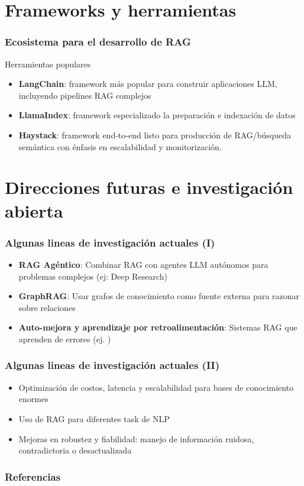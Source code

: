 \documentclass[handout]{beamer}
\begin{document}
\section{Frameworks y herramientas}
\begin{frame}
  \frametitle{Ecosistema para el desarrollo de RAG}
    \begin{block}{Herramientas populares}
        \begin{itemize}
            \item \textbf{LangChain}: framework más popular para construir aplicaciones LLM, incluyendo pipelines RAG complejos
            \item \textbf{LlamaIndex}: framework especializado la preparación e indexación de datos
            \item \textbf{Haystack}: framework end‐to‐end listo para producción de RAG/búsqueda semántica con énfasis en escalabilidad y monitorización.
        \end{itemize}
    \end{block}
\end{frame}

\section{Direcciones futuras e investigación abierta}
\begin{frame}
  \frametitle{Algunas lineas de investigación actuales (I)}
        \begin{itemize}
            \item \textbf{RAG Agéntico}: Combinar RAG con agentes LLM autónomos para problemas complejos (ej: Deep Research)
            \item \textbf{GraphRAG}: Usar grafos de conocimiento como fuente externa para razonar sobre relaciones
            \item \textbf{Auto-mejora y aprendizaje por retroalimentación}: Sistemas RAG que aprenden de errores (ej. \textcite{Asai2023SelfRAG})
        \end{itemize}
\end{frame}

\begin{frame}
  \frametitle{Algunas lineas de investigación actuales (II)}
        \begin{itemize}
            \item Optimización de costos, latencia y escalabilidad para bases de conocimiento enormes
            \item Uso de RAG para diferentes task de NLP
            \item Mejoras en robustez y fiabilidad: manejo de información ruidosa, contradictoria o desactualizada
        \end{itemize}
\end{frame}


\begin{frame}[allowframebreaks] 
  \frametitle{Referencias}
  \printbibliography
\end{frame}
\end{document}
